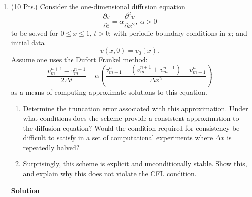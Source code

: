 \documentclass{article}
\begin{document}
\begin{enumerate}
\item (10 Pts.) Consider the one-dimensional diffusion equation
\[\frac{\partial v}{\partial t} = \alpha \frac{\partial^2 v}{\partial x^2}, \ \alpha > 0\]
to be solved for \(0 \leq x \leq 1\), \(t > 0\); with periodic boundary conditions in \(x\); and initial data
\[v(x,0) = v_0(x).\]
Assume one uses the Dufort Frankel method:
\[\frac{v^{n+1}_m - v^{n-1}_m}{2 \Delta t} - \alpha \left( \frac{v^n_{m+1} - (v^{n+1}_m + v^{n-1}_m) + v^n_{m-1}}{\Delta x^2} \right)\]
as a means of computing approximate solutions to this equation.

\begin{enumerate}
\item Determine the truncation error associated with this approximation.  Under what conditions does the scheme provide a consistent approximation to the diffusion equation?  Would the condition required for consistency be difficult to satisfy in a set of computational experiments where \(\Delta x\) is repeatedly halved?

\item Surprisingly, this scheme is explicit and unconditionally stable.  Show this, and explain why this does not violate the CFL condition.

\end{enumerate}

{\bf Solution}


\end{enumerate}
\end{document}

